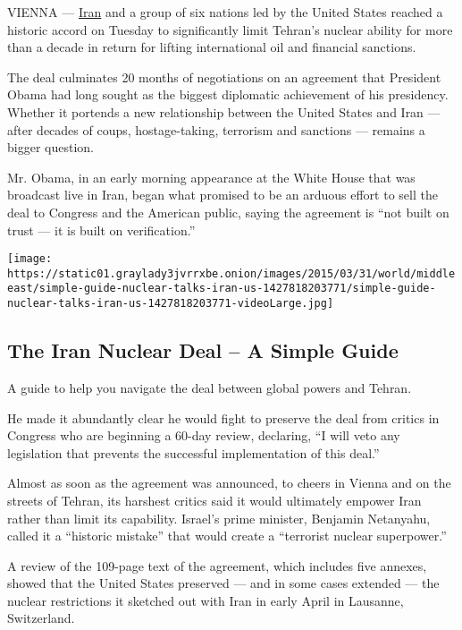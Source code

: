 VIENNA ---
\href{http://topics.nytimes3xbfgragh.onion/top/news/international/countriesandterritories/iran/index.html?inline=nyt-geo}{Iran}
and a group of six nations led by the United States reached a historic
accord on Tuesday to significantly limit Tehran's nuclear ability for
more than a decade in return for lifting international oil and financial
sanctions.

The deal culminates 20 months of negotiations on an agreement that
President Obama had long sought as the biggest diplomatic achievement of
his presidency. Whether it portends a new relationship between the
United States and Iran --- after decades of coups, hostage-taking,
terrorism and sanctions --- remains a bigger question.

Mr. Obama, in an early morning appearance at the White House that was
broadcast live in Iran, began what promised to be an arduous effort to
sell the deal to Congress and the American public, saying the agreement
is ``not built on trust --- it is built on verification.''

\href{https://www.nytimes3xbfgragh.onion/interactive/2015/03/31/world/middleeast/simple-guide-nuclear-talks-iran-us.html}{}

\texttt{[image: https://static01.graylady3jvrrxbe.onion/images/2015/03/31/world/middleeast/simple-guide-nuclear-talks-iran-us-1427818203771/simple-guide-nuclear-talks-iran-us-1427818203771-videoLarge.jpg]}

\hypertarget{the-iran-nuclear-deal--a-simple-guide}{%
\subsection{The Iran Nuclear Deal -- A Simple
Guide}\label{the-iran-nuclear-deal--a-simple-guide}}

A guide to help you navigate the deal between global powers and Tehran.

He made it abundantly clear he would fight to preserve the deal from
critics in Congress who are beginning a 60-day review, declaring, ``I
will veto any legislation that prevents the successful implementation of
this deal.''

Almost as soon as the agreement was announced, to cheers in Vienna and
on the streets of Tehran, its harshest critics said it would ultimately
empower Iran rather than limit its capability. Israel's prime minister,
Benjamin Netanyahu, called it a ``historic mistake'' that would create a
``terrorist nuclear superpower.''

A review of the 109-page text of the agreement, which includes five
annexes, showed that the United States preserved --- and in some cases
extended --- the nuclear restrictions it sketched out with Iran in early
April in Lausanne, Switzerland.

